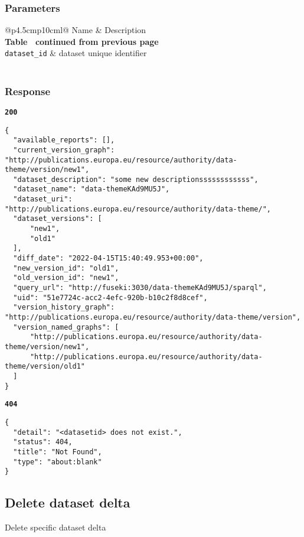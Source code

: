 \subsubsection{Parameters}
\begin{longtable}[c]{@{}p{4.5cm}p{10cm}l@{}}
  \toprule
  Name                 & Description                          \\* \midrule
  \endfirsthead
  \multicolumn{3}{c}%
  {{\bfseries Table \thetable\ continued from previous page}} \\
  \endhead
  \bottomrule
  \endfoot
  \endlastfoot
  \texttt{dataset\_id} & dataset unique identifier                  \\* \bottomrule
  \label{tab:rdf-differ-get-diff-parameters}                  \\
\end{longtable}

\subsubsection{Response}
\textbf{\texttt{200}}
\begin{lstlisting}
{
  "available_reports": [],
  "current_version_graph": "http://publications.europa.eu/resource/authority/data-theme/version/new1",
  "dataset_description": "some new descriptionssssssssssss",
  "dataset_name": "data-themeKAd9MU5J",
  "dataset_uri": "http://publications.europa.eu/resource/authority/data-theme/",
  "dataset_versions": [
      "new1",
      "old1"
  ],
  "diff_date": "2022-04-15T15:40:49.953+00:00",
  "new_version_id": "old1",
  "old_version_id": "new1",
  "query_url": "http://fuseki:3030/data-themeKAd9MU5J/sparql",
  "uid": "51e7724c-acc2-4efc-920b-b10c2f8d8cef",
  "version_history_graph": "http://publications.europa.eu/resource/authority/data-theme/version",
  "version_named_graphs": [
      "http://publications.europa.eu/resource/authority/data-theme/version/new1",
      "http://publications.europa.eu/resource/authority/data-theme/version/old1"
  ]
}
\end{lstlisting}

\textbf{\texttt{404}}
\begin{lstlisting}
{
  "detail": "<datasetid> does not exist.",
  "status": 404,
  "title": "Not Found",
  "type": "about:blank"
}
\end{lstlisting}

\subsection{Delete dataset delta}
Delete specific dataset delta

